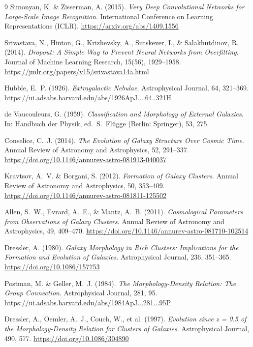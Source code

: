\documentclass[12pt, a4paper]{article}
\begin{document}
\begin{thebibliography}{9}
Simonyan, K. \& Zisserman, A. (2015).
\textit{Very Deep Convolutional Networks for Large-Scale Image Recognition}.
International Conference on Learning Representations (ICLR).
\url{https://arxiv.org/abs/1409.1556}

Srivastava, N., Hinton, G., Krizhevsky, A., Sutskever, I., \& Salakhutdinov, R. (2014).
\textit{Dropout: A Simple Way to Prevent Neural Networks from Overfitting}.
Journal of Machine Learning Research, 15(56), 1929--1958.
\url{https://jmlr.org/papers/v15/srivastava14a.html}

Hubble, E.~P. (1926).
\textit{Extragalactic Nebulae}.
Astrophysical Journal, 64, 321--369.
\url{https://ui.adsabs.harvard.edu/abs/1926ApJ....64..321H}

de Vaucouleurs, G. (1959).
\textit{Classification and Morphology of External Galaxies}.
In: Handbuch der Physik, ed.\ S.~Flügge (Berlin: Springer), 53, 275.

Conselice, C.~J. (2014).
\textit{The Evolution of Galaxy Structure Over Cosmic Time}.
Annual Review of Astronomy and Astrophysics, 52, 291--337.
\url{https://doi.org/10.1146/annurev-astro-081913-040037}

Kravtsov, A.~V. \& Borgani, S. (2012).
\textit{Formation of Galaxy Clusters}.
Annual Review of Astronomy and Astrophysics, 50, 353--409.
\url{https://doi.org/10.1146/annurev-astro-081811-125502}

Allen, S.~W., Evrard, A.~E., \& Mantz, A.~B. (2011).
\textit{Cosmological Parameters from Observations of Galaxy Clusters}.
Annual Review of Astronomy and Astrophysics, 49, 409--470.
\url{https://doi.org/10.1146/annurev-astro-081710-102514}

Dressler, A. (1980).
\textit{Galaxy Morphology in Rich Clusters: Implications for the Formation and Evolution of Galaxies}.
Astrophysical Journal, 236, 351--365.
\url{https://doi.org/10.1086/157753}

Postman, M. \& Geller, M.~J. (1984).
\textit{The Morphology-Density Relation: The Group Connection}.
Astrophysical Journal, 281, 95.
\url{https://ui.adsabs.harvard.edu/abs/1984ApJ...281...95P}

Dressler, A., Oemler, A.~J., Couch, W., et al. (1997).
\textit{Evolution since z = 0.5 of the Morphology-Density Relation for Clusters of Galaxies}.
Astrophysical Journal, 490, 577.
\url{https://doi.org/10.1086/304890}


\end{thebibliography}
\end{document}
